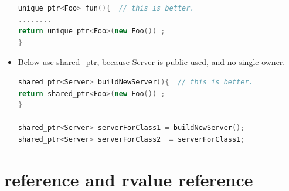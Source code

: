 \documentclass[a4paper,12pt,twoside]{book}
\begin{document}
\begin{itemize}
\begin{lstlisting}[frame=single, language=c++]
unique_ptr<Foo> fun(){  // this is better.
........
return unique_ptr<Foo>(new Foo()) ;
}
\end{lstlisting}
\item Below use shared\_ptr, because Server is public used, and no single owner.
\begin{lstlisting}[frame=single, language=c++]
shared_ptr<Server> buildNewServer(){  // this is better.
return shared_ptr<Foo>(new Foo()) ;
}

shared_ptr<Server> serverForClass1 = buildNewServer();
shared_ptr<Server> serverForClass2  = serverForClass1;
\end{lstlisting}

\end{itemize}




\section{reference and rvalue reference}
\end{document}
